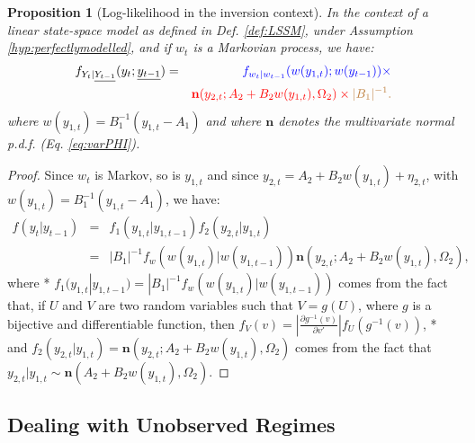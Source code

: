 \documentclass[
  12pt,
]{book}
\newtheorem{proposition}{Proposition}[chapter]
\theoremstyle{definition}
\theoremstyle{definition}
\theoremstyle{definition}
\theoremstyle{definition}
\theoremstyle{remark}
\begin{document}
\begin{proposition}[Log-likelihood in the inversion context]
\protect\hypertarget{prp:logLikinversion}{}\label{prp:logLikinversion}In the context of a linear state-space model as defined in Def. \ref{def:LSSM}, under Assumption \ref{hyp:perfectlymodelled}, and if \(w_t\) is a Markovian process, we have:
\begin{eqnarray}
f_{Y_t|\underline{Y_{t-1}}}(y_t;\underline{y_{t-1}}) &=& \color{blue}{f_{w_t|w_{t-1}}(w(y_{1,t});w(y_{t-1}))} \times \nonumber\\
&& \color{red}{\mathbf{n}(y_{2,t}; A_2 + B_2w(y_{1,t}),\Omega_2)} \times \color{brown}{|B_1|^{-1}}.\label{eq:inversionLogL}
\end{eqnarray}
where \(w(y_{1,t}) = B_{1}^{-1}(y_{1,t} - A_1)\) and where \(\mathbf{n}\) denotes the multivariate normal p.d.f. (Eq. \eqref{eq:varPHI}).
\end{proposition}

\begin{proof}
Since \(w_t\) is Markov, so is \(y_{1,t}\) and since \(y_{2,t} = A_2 + B_2 w(y_{1,t}) + \eta_{2,t}\), with \(w(y_{1,t}) = B_{1}^{-1}(y_{1,t} - A_1)\), we have:
\begin{eqnarray*}
f(y_t|y_{t-1}) &=& f_1(y_{1,t}|y_{1,t-1}) f_2(y_{2,t}|y_{1,t}) \\
&=& |B_1|^{-1} f_w(w(y_{1,t})|w(y_{1,t-1})) \mathbf{n}(y_{2,t}; A_2 + B_2w(y_{1,t}),\Omega_2),
\end{eqnarray*}
where
* \(f_1(y_{1,t}|y_{1,t-1})= |B_1|^{-1} f_w(w(y_{1,t})|w(y_{1,t-1}))\) comes from the fact that, if \(U\) and \(V\) are two random variables such that \(V = g(U)\), where \(g\) is a bijective and differentiable function, then \(f_V(v)=\left|\frac{\partial g^{-1}(v)}{\partial v'}\right| f_U(g^{-1}(v))\),
* and \(f_2(y_{2,t}|y_{1,t}) = \mathbf{n}(y_{2,t}; A_2 + B_2w(y_{1,t}),\Omega_2)\) comes from the fact that \(y_{2,t}|y_{1,t} \sim \mathbf{n}(A_2 + B_2 w(y_{1,t}),\Omega_2)\).
\end{proof}

\hypertarget{EstimationRS}{%
\subsection{Dealing with Unobserved Regimes}\label{EstimationRS}}
\end{document}
